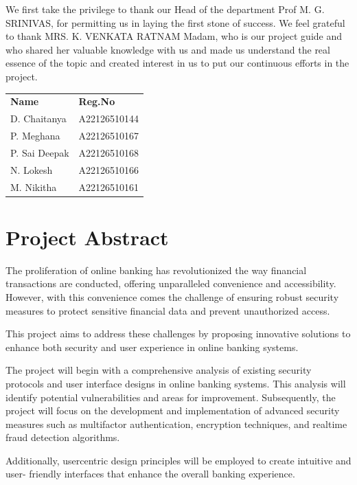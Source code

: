 We first take the privilege to thank our Head of the department Prof M.
G. SRINIVAS, for permitting us in laying the first stone of success. We
feel grateful to thank MRS\@. K\@. VENKATA RATNAM Madam, who is our project guide
and who shared her valuable knowledge with us and made us understand the real
essence of the topic and created interest in us to put our continuous efforts
in the project.

\vspace{2cm}
\begin{tabular}{ll}
  \textbf{Name} & \textbf{Reg.No} \\
  D. Chaitanya & A22126510144 \\
  P. Meghana & A22126510167 \\
  P. Sai Deepak & A22126510168 \\
  N. Lokesh & A22126510166 \\
  M. Nikitha & A22126510161 \\
\end{tabular}
\newpage{}

\tableofcontents{}
\newpage{}

\chapter{Project Abstract}

The proliferation of online banking has revolutionized the way
financial transactions are
conducted, offering unparalleled convenience and accessibility.
However, with this
convenience comes the challenge of ensuring robust security measures
to protect sensitive
financial data and prevent unauthorized access.

This project aims to address these challenges by proposing innovative
solutions to enhance
both security and user experience in online banking systems.

The project will begin with a comprehensive analysis of existing
security protocols and user
interface designs in online banking systems. This analysis will
identify potential
vulnerabilities and areas for improvement. Subsequently, the project
will focus on the
development and implementation of advanced security measures such as
multi\-factor
authentication, encryption techniques, and real\-time fraud detection algorithms.

Additionally, user\-centric design principles will be employed to
create intuitive and user-
friendly interfaces that enhance the overall banking experience.

